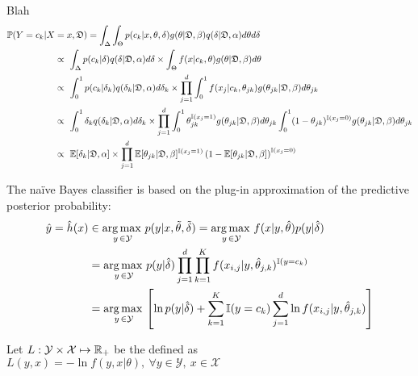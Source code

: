 Blah
\begin{align*}
    \operatorname{\mathbb{P}}(Y=c_k|X &=x,\mathfrak{D}) =\int_{\Delta}\int_{\Theta}p(c_k|x,\theta,\delta)g(\theta|\mathfrak{D},\beta)q(\delta|\mathfrak{D},\alpha)d\theta d\delta \\
    &\propto\ \int_{\Delta} p(c_k|\delta)q(\delta|\mathfrak{D},\alpha) d\delta\times \int_{\Theta}f(x|c_k,\theta) g(\theta|\mathfrak{D},\beta) d\theta \\
    &\propto\ \int_0^1 p(c_k|\delta_k) q(\delta_k|\mathfrak{D},\alpha) d\delta_k\times \prod_{j=1}^d \int_0^1 f(x_j|c_k,\theta_{jk}) g(\theta_{jk}|\mathfrak{D},\beta) d\theta_{jk}\\
    &\propto\ \int_0^1 \delta_k q(\delta_k|\mathfrak{D},\alpha) d\delta_k\times \prod_{j=1}^d \int_0^1 \theta_{jk}^{\operatorname{\mathbb{I}}(x_j=1)} g(\theta_{jk}|\mathfrak{D},\beta) d\theta_{jk}\int_0^1(1-\theta_{jk})^{\operatorname{\mathbb{I}}(x_j=0)} g(\theta_{jk}|\mathfrak{D},\beta) d\theta_{jk}\\
    &\propto\ \operatorname{\mathbb{E}} [\delta_k|\mathfrak{D},\alpha]\times\prod_{j=1}^d \operatorname{\mathbb{E}} [\theta_{jk}|\mathfrak{D},\beta]^{\operatorname{\mathbb{I}}(x_j=1)}\left(1-\operatorname{\mathbb{E}} [\theta_{jk}|\mathfrak{D},\beta]\right)^{\operatorname{\mathbb{I}}(x_j=0)}
\end{align*}











The naïve Bayes classifier is based on the plug-in approximation of the predictive posterior probability:
\begin{align*}
    \hat{y}=\hat{h}(x) &\in   \operatorname*{arg\,max\,}_{y\,\in\mathcal{Y}}p(y|x,\Tilde{\theta},\Tilde{\delta})  = \operatorname*{arg\,max\,}_{y\,\in\mathcal{Y}} f(x|y,\hat{\theta})p(y|\hat{\delta})\\
    &= \operatorname*{arg\,max\,}_{y\,\in\mathcal{Y}}p(y|\hat{\delta})\prod_{j=1}^d\prod_{k=1}^K  f(x_{i,j}|y,\hat{\theta}_{j,k})^{\operatorname{\mathbb{I}}(y=c_k)}\\
    &= \operatorname*{arg\,max\,}_{y\,\in\mathcal{Y}}\left[ \ln p(y|\hat{\delta})+\sum_{k=1}^K\operatorname{\mathbb{I}}(y=c_k)\sum_{j=1}^d  \ln f(x_{i,j}|y,\hat{\theta}_{j,k})\right]
\end{align*}




\clearpage
Let $L:\mathcal{Y}\times\mathcal{X}\mapsto\operatorname{\mathbb{R}}_+$ be the  defined as $L(y,x) = -\ln f(y,x|\theta),\ \forall y\in\mathcal{Y},\ x\in\mathcal{X}$









